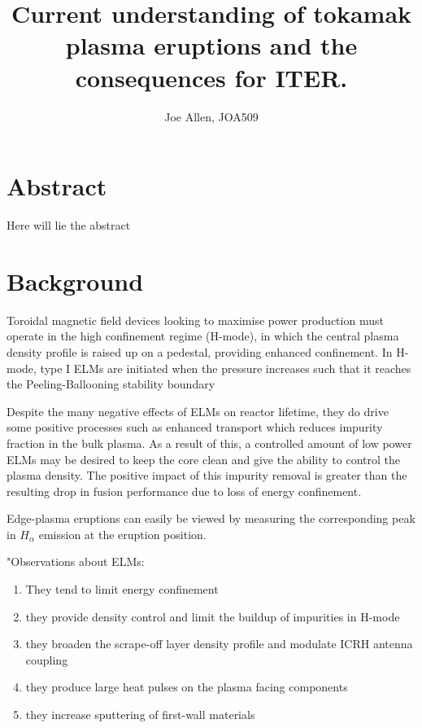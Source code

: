 \documentclass[12pt]{article}  %
\newcommand{\citep}[1]{\cite{#1}}
\begin{document}
\title{Current understanding of tokamak plasma eruptions and the consequences for ITER.}
\author{Joe Allen, JOA509}
\maketitle

\section{Abstract}
Here will lie the abstract

\section{Background}\label{sec:Bg}
Toroidal magnetic field devices looking to maximise power production must operate in the high confinement regime (H-mode), in which the central plasma density profile is raised up on a pedestal, providing enhanced confinement.\cite{Wagner2007}
In H-mode, type I ELMs are initiated when the pressure increases such that it reaches the Peeling-Ballooning stability boundary


Despite the many negative effects of ELMs on reactor lifetime, they do drive some positive processes such as enhanced transport which reduces impurity fraction in the bulk plasma. As a result of this, a controlled amount of low power ELMs may be desired to keep the core clean and give the ability to control the plasma density.\citep{Hill1997} The positive impact of this impurity removal is greater than the resulting drop in fusion performance due to loss of energy confinement.\cite{Connor2008}

Edge-plasma eruptions can easily be viewed by measuring the corresponding peak in $H_{\alpha}$ emission at the eruption position.\citep{Hill1997}

"Observations about ELMs: 
\begin{enumerate}
\item They tend to limit energy confinement
\item they provide density control and limit the buildup of impurities in H-mode
\item they broaden the scrape-off layer density profile and modulate ICRH antenna coupling
\item they produce large heat pulses on the plasma facing components 
\item they increase sputtering of first-wall materials
\end{enumerate}
\end{document}
